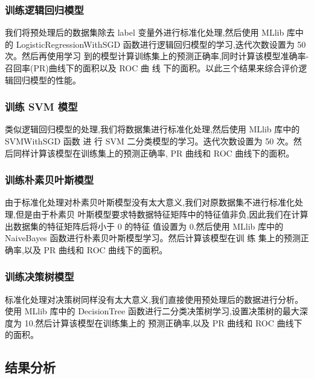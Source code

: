 \subsubsection{训练逻辑回归模型}\label{ux8badux7ec3ux903bux8f91ux56deux5f52ux6a21ux578b}

我们将预处理后的数据集除去 label 变量外进行标准化处理,然后使用 MLlib
库中的 LogisticRegressionWithSGD
函数进行逻辑回归模型的学习,迭代次数设置为 50 次。然后再使用学习
到的模型计算训练集上的预测正确率,同时计算该模型准确率-召回率(PR)曲线下的面积以及
ROC 曲 线 下的面积。以此三个结果来综合评价逻辑回归模型的性能。

\subsubsection{训练 SVM 模型}\label{ux8badux7ec3-svm-ux6a21ux578b}

类似逻辑回归模型的处理,我们将数据集进行标准化处理,然后使用 MLlib 库中的
SVMWithSGD 函数 进 行 SVM 二分类模型的学习。迭代次数设置为 50
次。然后同样计算该模型在训练集上的预测正确率, PR 曲线和 ROC
曲线下的面积。

\subsubsection{训练朴素贝叶斯模型}\label{ux8badux7ec3ux6734ux7d20ux8d1dux53f6ux65afux6a21ux578b}

由于标准化处理对朴素贝叶斯模型没有太大意义,我们对原数据集不进行标准化处理,但是由于朴素贝
叶斯模型要求特数据特征矩阵中的特征值非负,因此我们在计算出数据集的特征矩阵后将小于
0 的特征 值设置为 0.然后使用 MLlib 库中的 NaiveBayes
函数进行朴素贝叶斯模型学习。然后计算该模型在训 练 集上的预测正确率,以及
PR 曲线和 ROC 曲线下的面积。

\subsubsection{训练决策树模型}\label{ux8badux7ec3ux51b3ux7b56ux6811ux6a21ux578b}

标准化处理对决策树同样没有太大意义,我们直接使用预处理后的数据进行分析。使用
MLlib 库中的 DecisionTree
函数进行二分类决策树学习,设置决策树的最大深度为
10.然后计算该模型在训练集上的 预测正确率,以及 PR 曲线和 ROC
曲线下的面积。

\subsection{结果分析}\label{ux7ed3ux679cux5206ux6790}

